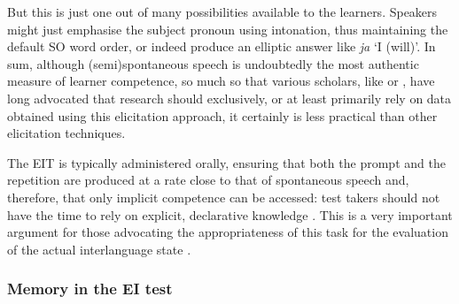 But this is just one out of many possibilities available to the learners. Speakers might just emphasise the subject pronoun using intonation, thus maintaining the default SO word order, or indeed produce an elliptic answer like \textit{ja} ‘I (will)’. In sum, although (semi)spontaneous speech is undoubtedly the most authentic \citep{Lewkowicz2000} measure of learner competence, so much so that various scholars, like \citet{Krashen1981} or \citet{Pienemann1998}, have long advocated that research should exclusively, or at least primarily rely on data obtained using this elicitation approach, it certainly is less practical than other elicitation techniques.

The EIT is typically administered orally, ensuring that both the prompt and the repetition are produced at a rate close to that of spontaneous speech and, therefore, that only implicit competence can be accessed: test takers should not have the time to rely on explicit, declarative knowledge \citep{Ellis2005}. This is a very important argument for those advocating the appropriateness of this task for the evaluation of the actual interlanguage state \citep{Erlam2006}.

\subsubsection{Memory in the EI test}

